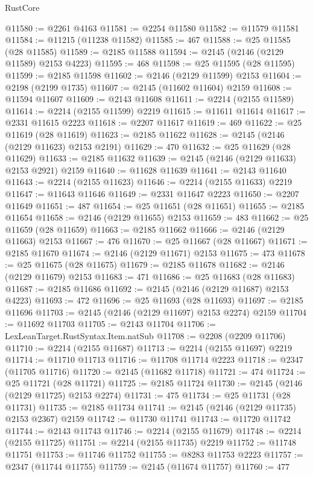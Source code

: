 \begin{lexlean}{RustCore}
\begin{coremodule}
@11580 := @2261 @4163
@11581 := @2254 @11580
@11582 := @11579 @11581
@11584 := @11215 (@11238 @11582)
@11585 := 467
@11588 := @25 @11585 (@28 @11585)
@11589 := @2185 @11588
@11594 := @2145 (@2146 (@2129 @11589) @2153 @4223)
@11595 := 468
@11598 := @25 @11595 (@28 @11595)
@11599 := @2185 @11598
@11602 := @2146 (@2129 @11599) @2153
@11604 := @2198 (@2199 @1735)
@11607 := @2145 (@11602 @11604) @2159
@11608 := @11594 @11607
@11609 := @2143 @11608
@11611 := @2214 (@2155 @11589)
@11614 := @2214 (@2155 @11599) @2219
@11615 := @11611 @11614
@11617 := @2331 @11615 @2223
@11618 := @2207 @11617
@11619 := 469
@11622 := @25 @11619 (@28 @11619)
@11623 := @2185 @11622
@11628 := @2145 (@2146 (@2129 @11623) @2153 @2191)
@11629 := 470
@11632 := @25 @11629 (@28 @11629)
@11633 := @2185 @11632
@11639 := @2145 (@2146 (@2129 @11633) @2153 @2921) @2159
@11640 := @11628 @11639
@11641 := @2143 @11640
@11643 := @2214 (@2155 @11623)
@11646 := @2214 (@2155 @11633) @2219
@11647 := @11643 @11646
@11649 := @2331 @11647 @2223
@11650 := @2207 @11649
@11651 := 487
@11654 := @25 @11651 (@28 @11651)
@11655 := @2185 @11654
@11658 := @2146 (@2129 @11655) @2153
@11659 := 483
@11662 := @25 @11659 (@28 @11659)
@11663 := @2185 @11662
@11666 := @2146 (@2129 @11663) @2153
@11667 := 476
@11670 := @25 @11667 (@28 @11667)
@11671 := @2185 @11670
@11674 := @2146 (@2129 @11671) @2153
@11675 := 473
@11678 := @25 @11675 (@28 @11675)
@11679 := @2185 @11678
@11682 := @2146 (@2129 @11679) @2153
@11683 := 471
@11686 := @25 @11683 (@28 @11683)
@11687 := @2185 @11686
@11692 := @2145 (@2146 (@2129 @11687) @2153 @4223)
@11693 := 472
@11696 := @25 @11693 (@28 @11693)
@11697 := @2185 @11696
@11703 := @2145 (@2146 (@2129 @11697) @2153 @2274) @2159
@11704 := @11692 @11703
@11705 := @2143 @11704
@11706 := LexLeanTarget.RustSyntax.Item.natSub
@11708 := @2208 (@2209 @11706)
@11710 := @2214 (@2155 @11687)
@11713 := @2214 (@2155 @11697) @2219
@11714 := @11710 @11713
@11716 := @11708 @11714 @2223
@11718 := @2347 (@11705 @11716)
@11720 := @2145 (@11682 @11718)
@11721 := 474
@11724 := @25 @11721 (@28 @11721)
@11725 := @2185 @11724
@11730 := @2145 (@2146 (@2129 @11725) @2153 @2274)
@11731 := 475
@11734 := @25 @11731 (@28 @11731)
@11735 := @2185 @11734
@11741 := @2145 (@2146 (@2129 @11735) @2153 @2367) @2159
@11742 := @11730 @11741
@11743 := @11720 @11742
@11744 := @2143 @11743
@11746 := @2214 (@2155 @11679)
@11748 := @2214 (@2155 @11725)
@11751 := @2214 (@2155 @11735) @2219
@11752 := @11748 @11751
@11753 := @11746 @11752
@11755 := @8283 @11753 @2223
@11757 := @2347 (@11744 @11755)
@11759 := @2145 (@11674 @11757)
@11760 := 477

\end{coremodule}
\end{lexlean}
